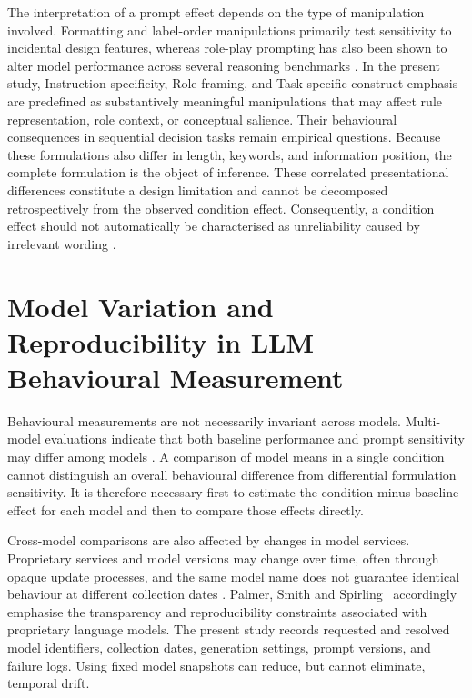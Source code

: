 \documentclass[logo,msc]{infthesis}
\begin{document}
The interpretation of a prompt effect depends on the type of manipulation involved. Formatting and label-order manipulations primarily test sensitivity to incidental design features, whereas role-play prompting has also been shown to alter model performance across several reasoning benchmarks \cite{Kong2024RolePlayPrompting}. In the present study, Instruction specificity, Role framing, and Task-specific construct emphasis are predefined as substantively meaningful manipulations that may affect rule representation, role context, or conceptual salience. Their behavioural consequences in sequential decision tasks remain empirical questions. Because these formulations also differ in length, keywords, and information position, the complete formulation is the object of inference. These correlated presentational differences constitute a design limitation and cannot be decomposed retrospectively from the observed condition effect. Consequently, a condition effect should not automatically be characterised as unreliability caused by irrelevant wording \cite{Sclar2024PromptFormatting,Hua2025FlawArtifact}.

\section{Model Variation and Reproducibility in LLM Behavioural Measurement}

Behavioural measurements are not necessarily invariant across models. Multi-model evaluations indicate that both baseline performance and prompt sensitivity may differ among models \cite{Sclar2024PromptFormatting,Mizrahi2024MultiPrompt,Zhuo2024ProSA}. A comparison of model means in a single condition cannot distinguish an overall behavioural difference from differential formulation sensitivity. It is therefore necessary first to estimate the condition-minus-baseline effect for each model and then to compare those effects directly.

Cross-model comparisons are also affected by changes in model services. Proprietary services and model versions may change over time, often through opaque update processes, and the same model name does not guarantee identical behaviour at different collection dates \cite{Chen2024ChatGPTBehavior}. Palmer, Smith and Spirling~\cite{Palmer2024ProprietaryModels} accordingly emphasise the transparency and reproducibility constraints associated with proprietary language models. The present study records requested and resolved model identifiers, collection dates, generation settings, prompt versions, and failure logs. Using fixed model snapshots can reduce, but cannot eliminate, temporal drift.
\end{document}
